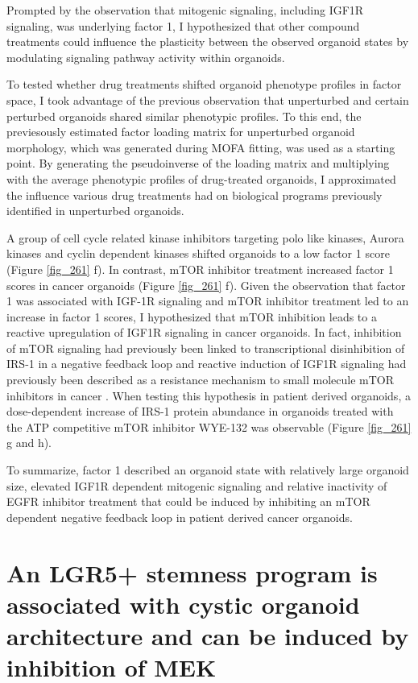 \begin{flushleft}
\bigbreak
Prompted by the observation that mitogenic signaling, including IGF1R signaling, was underlying factor 1, I hypothesized that other compound treatments could influence the plasticity between the observed organoid states by modulating signaling pathway activity within organoids. 

\bigbreak
To tested whether drug treatments shifted organoid phenotype profiles in factor space, I took advantage of the previous observation that unperturbed and certain perturbed organoids shared similar phenotypic profiles. To this end, the previesously estimated factor loading matrix for unperturbed organoid morphology, which was generated during MOFA fitting, was used as a starting point. By generating the pseudoinverse of the loading matrix and multiplying with the average phenotypic profiles of drug-treated organoids, I approximated the influence various drug treatments had on biological programs previously identified in unperturbed organoids. 

\bigbreak
A group of cell cycle related kinase inhibitors targeting polo like kinases, Aurora kinases and cyclin dependent kinases shifted organoids to a low factor 1 score (Figure \ref{fig_261} f). In contrast, mTOR inhibitor treatment increased factor 1 scores in cancer organoids (Figure \ref{fig_261} f). Given the observation that factor 1 was associated with IGF-1R signaling and mTOR inhibitor treatment led to an increase in factor 1 scores, I hypothesized that mTOR inhibition leads to a reactive upregulation of IGF1R signaling in cancer organoids. In fact, inhibition of mTOR signaling had previously been linked to transcriptional disinhibition of IRS-1 in a negative feedback loop \cite{OReilly2006-fc} and  reactive induction of IGF1R signaling had previously been described as a resistance mechanism to small molecule mTOR inhibitors in cancer \cite{Sharma2010-qa}. When testing this hypothesis in patient derived organoids, a dose-dependent increase of IRS-1 protein abundance in organoids treated with the ATP competitive mTOR inhibitor WYE-132 was observable (Figure \ref{fig_261} g and h). 

\bigbreak
To summarize, factor 1 described an organoid state with relatively large organoid size, elevated IGF1R dependent mitogenic signaling and relative inactivity of EGFR inhibitor treatment that could be induced by inhibiting an mTOR dependent negative feedback loop in patient derived cancer organoids.

\newpage
\section{An LGR5+ stemness program is associated with cystic organoid architecture and can be induced by inhibition of MEK}


\end{flushleft}

